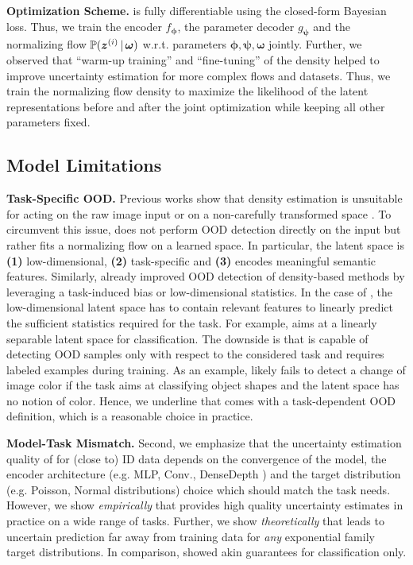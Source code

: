 \textbf{Optimization Scheme.} \NatPNacro{} is fully differentiable using the closed-form Bayesian loss. Thus, we train the encoder $f_{\bm{\phi}}$, the parameter decoder $g_{\bm{\psi}}$ and the normalizing flow $\operatorname{\mathbb{P}}(\bm{z}^{(i)} \,|\, \bm{\omega})$ w.r.t. parameters $\bm{\phi}, \bm{\psi}, \bm{\omega}$ jointly. Further, we observed that ``warm-up training'' \citep{warm-start} and ``fine-tuning'' \citep{fine-tuning-continuous} of the density helped to improve uncertainty estimation for more complex flows and datasets. Thus, we train the normalizing flow density to maximize the likelihood of the latent representations before and after the joint optimization while keeping all other parameters fixed.

\subsection{Model Limitations} \label{sec:limitations}

\textbf{Task-Specific OOD.} Previous works show that density estimation is unsuitable for acting on the raw image input \citep{anomaly-detection,deep-generative,typicality_OOD_generative} or on a non-carefully transformed space \citep{perfect-density-no-ood-guarantee}. To circumvent this issue, \NatPNacro{} does not perform OOD detection directly on the input but rather fits a normalizing flow on a learned space. In particular, the latent space is \textbf{(1)} low-dimensional, \textbf{(2)} task-specific and \textbf{(3)} encodes meaningful semantic features. Similarly, \citet{postnet, why-nf-fail-ood, density-states-ood, contrastive-ood} already improved OOD detection of density-based methods by leveraging a task-induced bias or low-dimensional statistics. In the case of \NatPNacro{}, the low-dimensional latent space has to contain relevant features to linearly predict the sufficient statistics required for the task. For example, \NatPNacro{} aims at a linearly separable latent space for classification. The downside is that \NatPNacro{} is capable of detecting OOD samples only with respect to the considered task and requires labeled examples during training. As an example, \NatPNacro{} likely fails to detect a change of image color if the task aims at classifying object shapes and the latent space has no notion of color. Hence, we underline that \NatPNacro{} comes with a task-dependent OOD definition, which is a reasonable choice in practice.

\textbf{Model-Task Mismatch.} Second, we emphasize that the uncertainty estimation quality of \NatPNacro{} for (close to) ID data depends on the convergence of the model, the encoder architecture (e.g. MLP, Conv., DenseDepth \citep{dense-depth}) and the target distribution (e.g. Poisson, Normal distributions) choice which should match the task needs. However, we show \emph{empirically} that \NatPNacro{} provides high quality uncertainty estimates in practice on a wide range of tasks. Further, we show \emph{theoretically} that \NatPNacro{} leads to uncertain prediction far away from training data for \emph{any} exponential family target distributions. In comparison, \citet{provable-uncertainty} showed akin guarantees for classification only.